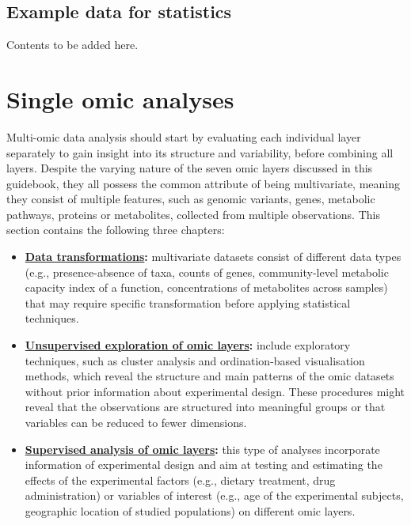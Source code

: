 \documentclass[
]{book}
\providecommand{\tightlist}{%
  \setlength{\itemsep}{0pt}\setlength{\parskip}{0pt}}
\begin{document}
\hypertarget{example-data-statistics}{%
\section{Example data for statistics}\label{example-data-statistics}}

Contents to be added here.

\hypertarget{single-omic-analyses}{%
\chapter{Single omic analyses}\label{single-omic-analyses}}

Multi-omic data analysis should start by evaluating each individual layer separately to gain insight into its structure and variability, before combining all layers. Despite the varying nature of the seven omic layers discussed in this guidebook, they all possess the common attribute of being multivariate, meaning they consist of multiple features, such as genomic variants, genes, metabolic pathways, proteins or metabolites, collected from multiple observations. This section contains the following three chapters:

\begin{itemize}
\tightlist
\item
  \textbf{\protect\hyperlink{data-transformations}{Data transformations}:} multivariate datasets consist of different data types (e.g., presence-absence of taxa, counts of genes, community-level metabolic capacity index of a function, concentrations of metabolites across samples) that may require specific transformation before applying statistical techniques.
\item
  \textbf{\protect\hyperlink{unsupervised-exploration}{Unsupervised exploration of omic layers}:} include exploratory techniques, such as cluster analysis and ordination-based visualisation methods, which reveal the structure and main patterns of the omic datasets without prior information about experimental design. These procedures might reveal that the observations are structured into meaningful groups or that variables can be reduced to fewer dimensions.
\item
  \textbf{\protect\hyperlink{supervised-analysis}{Supervised analysis of omic layers}:} this type of analyses incorporate information of experimental design and aim at testing and estimating the effects of the experimental factors (e.g., dietary treatment, drug administration) or variables of interest (e.g., age of the experimental subjects, geographic location of studied populations) on different omic layers.
\end{itemize}
\end{document}
